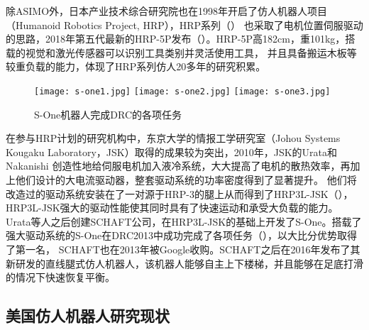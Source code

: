 除ASIMO外，日本产业技术综合研究院也在1998年开启了仿人机器人项目（Humanoid Robotics Project, HRP），HRP系列（）
也采取了电机位置伺服驱动的思路，2018年第五代最新的HRP-5P发布（）。HRP-5P高182cm，重101kg，搭载的视觉和激光传感器可以识别工具类别并灵活使用工具，
并且具备搬运木板等较重负载的能力\cite{HRP}，体现了HRP系列仿人20多年的研究积累。
\begin{figure}[htbp]
    \centering
    \texttt{[image: s-one1.jpg]}
    \texttt{[image: s-one2.jpg]}
    \texttt{[image: s-one3.jpg]}
    \caption{\label{fig:s-one}S-One机器人完成DRC的各项任务}
\end{figure}
在参与HRP计划的研究机构中，东京大学的情报工学研究室（Johou Systems Kougaku Laboratory，JSK）取得的成果较为突出，2010年，JSK的Urata和Nakanishi
创造性地给伺服电机加入液冷系统，大大提高了电机的散热效率，再加上他们设计的大电流驱动器，整套驱动系统的功率密度得到了显著提升。
他们将改造过的驱动系统安装在了一对源于HRP-3的腿上从而得到了HRP3L-JSK（），HRP3L-JSK强大的驱动性能使其同时具有了快速运动和承受大负载的能力。
Urata等人之后创建SCHAFT公司，在HRP3L-JSK的基础上开发了S-One。搭载了强大驱动系统的S-One在DRC2013中成功完成了各项任务（），以大比分优势取得了第一名，
SCHAFT也在2013年被Google收购。SCHAFT之后在2016年发布了其新研发的直线腿式仿人机器人，该机器人能够自主上下楼梯，并且能够在足底打滑的情况下快速恢复平衡\cite{SCHAFT}。

\subsection{美国仿人机器人研究现状}

